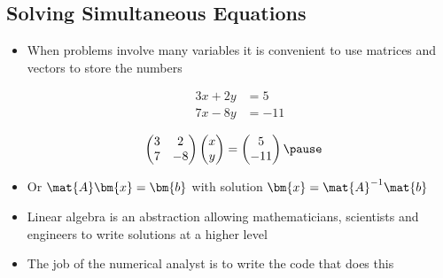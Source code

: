 \begin{slide}
\section[-1]{Solving Simultaneous Equations}

\begin{PauseHighLight}
  \begin{itemize}
  \item When problems involve many variables it is convenient to use
    matrices and vectors to store the numbers\pause\\
    \begin{minipage}{0.4\linewidth}
    \vspace*{-13mm}
    \begin{align*}
      3 x + 2y &= 5\\
      7 x - 8y &= -11
    \end{align*}\pause
  \end{minipage}
  \begin{minipage}[b]{0.4\linewidth}
    \begin{align*}
      \begin{pmatrix}
        3 & 2 \\ 7 & -8
      \end{pmatrix}
      \begin{pmatrix}
        x \\ y
      \end{pmatrix} &=
      \begin{pmatrix}
        5 \\ -11
      \end{pmatrix}\pause
    \end{align*}
  \end{minipage}
  \vspace*{-2cm}
\item Or $\mat{A} \bm{x} = \bm{b}$ with solution $\bm{x} = \mat{A}^{-1}
  \mat{b}$\pause
\item Linear algebra is an abstraction allowing mathematicians,
  scientists and engineers to write solutions at a higher level\pause
\item The job of the numerical analyst is to write the code that does
  this\pause 
\end{itemize}
\end{PauseHighLight}

\end{slide}


